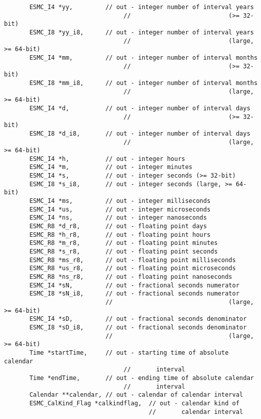 \begin{verbatim}       ESMC_I4 *yy,         // out - integer number of interval years
                                 //                           (>= 32-bit)
       ESMC_I8 *yy_i8,      // out - integer number of interval years
                                 //                           (large, >= 64-bit)
       ESMC_I4 *mm,         // out - integer number of interval months
                                 //                           (>= 32-bit)
       ESMC_I8 *mm_i8,      // out - integer number of interval months
                                 //                           (large, >= 64-bit)
       ESMC_I4 *d,          // out - integer number of interval days
                                 //                           (>= 32-bit)
       ESMC_I8 *d_i8,       // out - integer number of interval days
                                 //                           (large, >= 64-bit)
       ESMC_I4 *h,          // out - integer hours
       ESMC_I4 *m,          // out - integer minutes
       ESMC_I4 *s,          // out - integer seconds (>= 32-bit)
       ESMC_I8 *s_i8,       // out - integer seconds (large, >= 64-bit)
       ESMC_I4 *ms,         // out - integer milliseconds
       ESMC_I4 *us,         // out - integer microseconds
       ESMC_I4 *ns,         // out - integer nanoseconds
       ESMC_R8 *d_r8,       // out - floating point days
       ESMC_R8 *h_r8,       // out - floating point hours
       ESMC_R8 *m_r8,       // out - floating point minutes
       ESMC_R8 *s_r8,       // out - floating point seconds
       ESMC_R8 *ms_r8,      // out - floating point milliseconds
       ESMC_R8 *us_r8,      // out - floating point microseconds
       ESMC_R8 *ns_r8,      // out - floating point nanoseconds
       ESMC_I4 *sN,         // out - fractional seconds numerator
       ESMC_I8 *sN_i8,      // out - fractional seconds numerator
                            //                                (large, >= 64-bit)
       ESMC_I4 *sD,         // out - fractional seconds denominator
       ESMC_I8 *sD_i8,      // out - fractional seconds denominator
                            //                                (large, >= 64-bit)
       Time *startTime,     // out - starting time of absolute calendar
                                 //       interval
       Time *endTime,       // out - ending time of absolute calendar
                                 //       interval
       Calendar **calendar, // out - calendar of calendar interval
       ESMC_CalKind_Flag *calkindflag,  // out - calendar kind of
                                        //       calendar interval

\end{verbatim}
